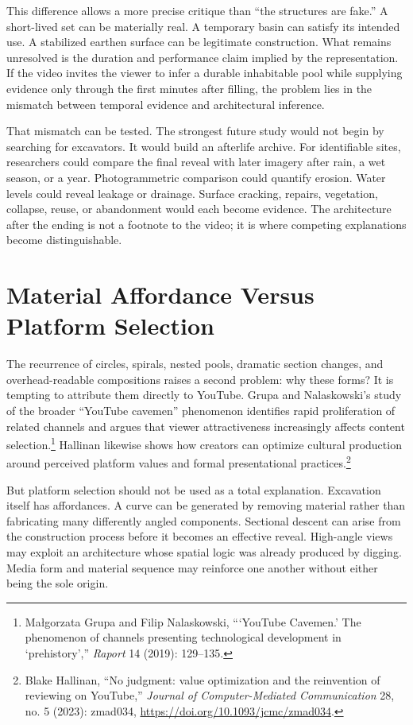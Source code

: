 \documentclass[11pt]{article}
\begin{document}
This difference allows a more precise critique than ``the structures are fake.'' A short-lived set can be materially real. A temporary basin can satisfy its intended use. A stabilized earthen surface can be legitimate construction. What remains unresolved is the duration and performance claim implied by the representation. If the video invites the viewer to infer a durable inhabitable pool while supplying evidence only through the first minutes after filling, the problem lies in the mismatch between temporal evidence and architectural inference.

That mismatch can be tested. The strongest future study would not begin by searching for excavators. It would build an afterlife archive. For identifiable sites, researchers could compare the final reveal with later imagery after rain, a wet season, or a year. Photogrammetric comparison could quantify erosion. Water levels could reveal leakage or drainage. Surface cracking, repairs, vegetation, collapse, reuse, or abandonment would each become evidence. The architecture after the ending is not a footnote to the video; it is where competing explanations become distinguishable.

\section{Material Affordance Versus Platform Selection}

The recurrence of circles, spirals, nested pools, dramatic section changes, and overhead-readable compositions raises a second problem: why these forms? It is tempting to attribute them directly to YouTube. Grupa and Nalaskowski's study of the broader ``YouTube cavemen'' phenomenon identifies rapid proliferation of related channels and argues that viewer attractiveness increasingly affects content selection.\footnote{Małgorzata Grupa and Filip Nalaskowski, ``‘YouTube Cavemen.’ The phenomenon of channels presenting technological development in ‘prehistory’,'' \emph{Raport} 14 (2019): 129--135.} Hallinan likewise shows how creators can optimize cultural production around perceived platform values and formal presentational practices.\footnote{Blake Hallinan, ``No judgment: value optimization and the reinvention of reviewing on YouTube,'' \emph{Journal of Computer-Mediated Communication} 28, no. 5 (2023): zmad034, \url{https://doi.org/10.1093/jcmc/zmad034}.}

But platform selection should not be used as a total explanation. Excavation itself has affordances. A curve can be generated by removing material rather than fabricating many differently angled components. Sectional descent can arise from the construction process before it becomes an effective reveal. High-angle views may exploit an architecture whose spatial logic was already produced by digging. Media form and material sequence may reinforce one another without either being the sole origin.
\end{document}
